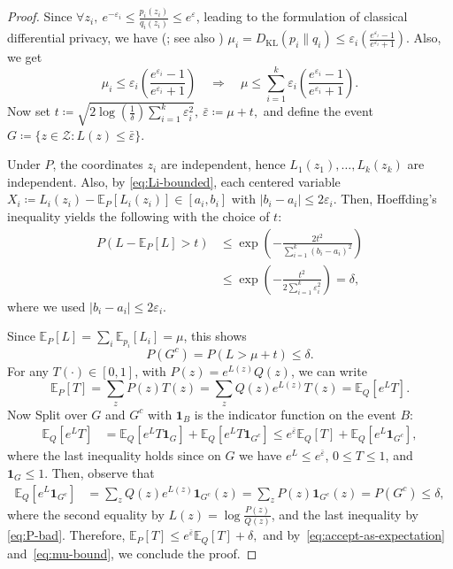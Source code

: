 \documentclass[11pt]{article}
\theoremstyle{plain}
\theoremstyle{remark}
\begin{document}
\begin{proof}
Since $\forall z_i, \ e^{-\varepsilon_i} \leq \frac{p_i(z_i)}{q_i(z_i)} \leq e^{\varepsilon} $, leading to the formulation of classical differential privacy, we have (\citep[Theorem~5]{DP_Sten}; see also \citep{BS16,harrison2025exact})
$
   \mu_i = D_{\operatorname{KL}}(p_i\|q_i) \leq \varepsilon_i \left( \frac{e^{\varepsilon_i}-1}{e^{\varepsilon_i} +1} \right).
$
Also, we get
\begin{equation}\label{eq:mu-bound}
\mu_i \leq \varepsilon_i \left( \frac{e^{\varepsilon_i}-1}{e^{\varepsilon_i} +1} \right)
\quad\Longrightarrow\quad
\mu \leq \sum_{i=1}^k \varepsilon_i \left( \frac{e^{\varepsilon_i}-1}{e^{\varepsilon_i} +1} \right).
\end{equation}
Now set
$
    t\coloneqq\sqrt{2\log\!\left(\frac1\delta\right)\sum_{i=1}^k\varepsilon_i^2},
\
\bar\varepsilon\coloneqq\mu+t,
$
and define the event
$
    G\coloneqq\{z\in\mathcal Z:  L(z)\leq \bar\varepsilon\}.
$

Under $P$, the coordinates $z_i$ are independent, hence $L_1(z_1),\ldots,L_k(z_k)$ are independent.
Also, by \eqref{eq:Li-bounded}, each centered variable
$X_i \coloneqq L_i(z_i)-\mathbb{E}_{P}[L_i(z_i)] \in [a_i, b_i]$ with $|b_i-a_i | \leq 2 \varepsilon_i$.
Then, Hoeffding's inequality yields the following with the choice of $t$:
\begin{align}
     P\!\left( L-\mathbb{E}_P[L] > t \right) &\leq  \exp\!\left(-\frac{2 t^2}{\sum_{i=1}^k (b_i-a_i)^2 }\right) \\
     & \leq \exp\!\left(-\frac{t^2}{2\sum_{i=1}^k \varepsilon_i^2}\right) = \delta, 
\end{align}
where we used $|b_i-a_i| \leq 2 \varepsilon_i$.

Since $\mathbb{E}_P[L]=\sum_i \mathbb{E}_{p_i}[L_i]=\mu$, this shows
\begin{equation}\label{eq:P-bad}
P(G^c)=P(L>\mu+t)\leq \delta.
\end{equation}
For any $T(\cdot)\in[0,1]$, 
with $P(z)=e^{L(z)}Q(z)$, we can write
\begin{equation}
    \mathbb{E}_{P}[T] = \sum_z P(z)T(z)=\sum_z Q(z)e^{L(z)}T(z)=\mathbb{E}_Q[e^{L}T].
\end{equation}
Now Split over $G$ and $G^c$ with $\mathbf 1_{B}$ is the indicator function on the event $B$:
\begin{align}
    \mathbb{E}_Q[e^L T]
& = \mathbb{E}_Q[e^L T\mathbf 1_G] + \mathbb{E}_Q[e^L T\mathbf 1_{G^c}] \leq e^{\bar\varepsilon}\mathbb{E}_Q[T] + \mathbb{E}_Q[e^L \mathbf 1_{G^c}],
\end{align}
where the last inequality holds since on $G$ we have $e^L\le e^{\bar\varepsilon}$, $0\le T\leq 1$, and $\mathbf 1_G \leq 1$.
Then, observe that
\begin{align}
    \mathbb{E}_Q[e^L \mathbf 1_{G^c}] &= \sum_z Q(z)e^{L(z)}\mathbf 1_{G^c}(z) = \sum_z P(z)\mathbf 1_{G^c}(z)  = P(G^c) \leq \delta,
\end{align}
where the second equality by $L(z)= \log\frac{P(z)}{Q(z)}$, and the last inequality
by \eqref{eq:P-bad}. Therefore,
$\mathbb{E}_P[T] \leq e^{\bar\varepsilon} \mathbb{E}_Q[T] + \delta,$
and by~\eqref{eq:accept-as-expectation} and~\eqref{eq:mu-bound}, we conclude the proof.
\end{proof}
\end{document}
